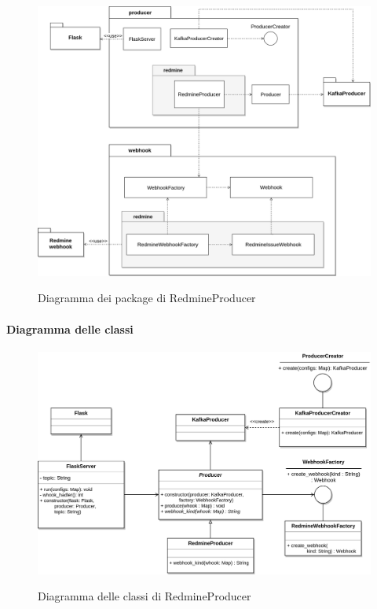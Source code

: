 \begin{figure}[H]
    \centering
    \includegraphics[width=\textwidth]{img/Package-RedmineProducer.png}\\
    \caption{Diagramma dei package di RedmineProducer}
\end{figure}

\paragraph{Diagramma delle classi}

\begin{figure}[H]
    \centering
    \includegraphics[width=\textwidth]{img/Producers-RedmineProducer.png}\\
    \caption{Diagramma delle classi di RedmineProducer}
\end{figure}

